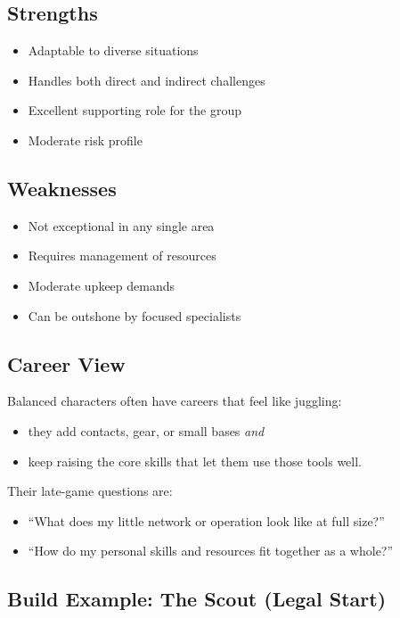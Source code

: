 \subsection*{Strengths}
\begin{itemize}
\item Adaptable to diverse situations
\item Handles both direct and indirect challenges
\item Excellent supporting role for the group
\item Moderate risk profile
\end{itemize}

\subsection*{Weaknesses}
\begin{itemize}
\item Not exceptional in any single area
\item Requires management of resources
\item Moderate upkeep demands
\item Can be outshone by focused specialists
\end{itemize}

\subsection*{Career View}

Balanced characters often have careers that feel like juggling:
\begin{itemize}
  \item they add contacts, gear, or small bases \emph{and}
  \item keep raising the core skills that let them use those tools well.
\end{itemize}

Their late-game questions are:
\begin{itemize}
  \item ``What does my little network or operation look like at full size?''
  \item ``How do my personal skills and resources fit together as a whole?'' 
\end{itemize}

\subsection*{Build Example: The Scout (Legal Start)}

